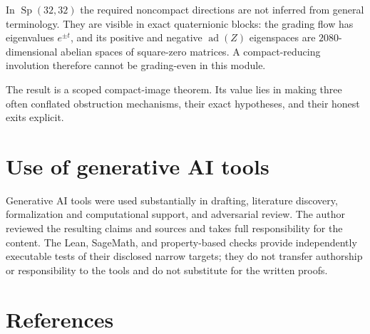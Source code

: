 \documentclass[
  10pt,
  letterpaper,
  oneside]{scrartcl}
\begin{document}
In \(\operatorname{Sp}(32,32)\) the required noncompact directions are
not inferred from general terminology. They are visible in exact
quaternionic blocks: the grading flow has eigenvalues \(e^{\pm t}\), and
its positive and negative \(\operatorname{ad}(Z)\) eigenspaces are
\(2080\)-dimensional abelian spaces of square-zero matrices. A
compact-reducing involution therefore cannot be grading-even in this
module.

The result is a scoped compact-image theorem. Its value lies in making
three often conflated obstruction mechanisms, their exact hypotheses,
and their honest exits explicit.

\section{Use of generative AI tools}\label{use-of-generative-ai-tools}

Generative AI tools were used substantially in drafting, literature
discovery, formalization and computational support, and adversarial
review. The author reviewed the resulting claims and sources and takes
full responsibility for the content. The Lean, SageMath, and
property-based checks provide independently executable tests of their
disclosed narrow targets; they do not transfer authorship or
responsibility to the tools and do not substitute for the written
proofs.

\section{References}\label{references}
\end{document}
